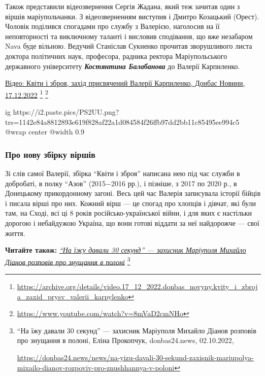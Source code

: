 Також представили відеозвернення Сергія Жадана, який теж зачитав один з віршів
маріупольчанки. З відеозверненням виступив і Дмитро Козацький (Орест). Чоловік
поділився спогадами про службу з Валерією, наголосив на її неповторності та
виключному таланті і висловив сподівання, що вже незабаром Nava буде вільною.
Ведучий Станіслав Сукненко прочитав зворушливого листа доктора політичних наук,
професора, радника ректора Маріупольського державного університету \emph{\textbf{Костянтина
Балабанова}} до Валерії Карпиленко.

\href{https://archive.org/details/video.17_12_2022.donbas_novyny.kvity_i_zbroja_zaxid_prysv_valerii_karpylenko}{%
Відео: Квіти і зброя, захід присвячений Валерії Карпиленко, Донбас Новини, 17.12.2022}%
\footnote{\url{https://archive.org/details/video.17_12_2022.donbas_novyny.kvity_i_zbroja_zaxid_prysv_valerii_karpylenko}} %
\footnote{\url{https://www.youtube.com/watch?v=8mVaD2cmNHo}}

\ifcmt
  ig https://i2.paste.pics/PS2UU.png?trs=1142e84a8812893e619f828af22a1d084584f26ffb97dd2bb11c85495ee994c5
  @wrap center
  @width 0.9
\fi

\subsubsection{Про нову збірку віршів}

Зі слів самої Валерії, збірка \enquote{Квіти і зброя} написана нею під час служби в
добробаті, в полку \enquote{Азов} (2015−2016 рр.), і пізніше, з 2017 по 2020 р., в
Донецькому прикордонному загоні. Весь цей час Валерія записувала історії бійців
і писала вірші про них. Кожний вірш — це спогад про хлопців і дівчат, які були
там, на Сході, всі ці 8 років російсько-української війни, і для яких є
настільки дорогою і небайдужою Україна, що вони готові віддати за неї
найдорожче — свої життя.


\textbf{Читайте також:} \href{https://donbas24.news/news/na-yizu-davali-30-sekund-zaxisnik-mariupolya-mixailo-dianov-rozpoviv-pro-znushhannya-v-poloni}{\emph{\enquote{На їжу давали 30 секунд} — захисник Маріуполя Михайло Діанов розповів про знущання в полоні}}%
\footnote{\enquote{На їжу давали 30 секунд} — захисник Маріуполя Михайло Діанов розповів про знущання в полоні, Еліна Прокопчук, donbas24.news, 02.10.2022, \par%
\url{https://donbas24.news/news/na-yizu-davali-30-sekund-zaxisnik-mariupolya-mixailo-dianov-rozpoviv-pro-znushhannya-v-poloni}%
}

